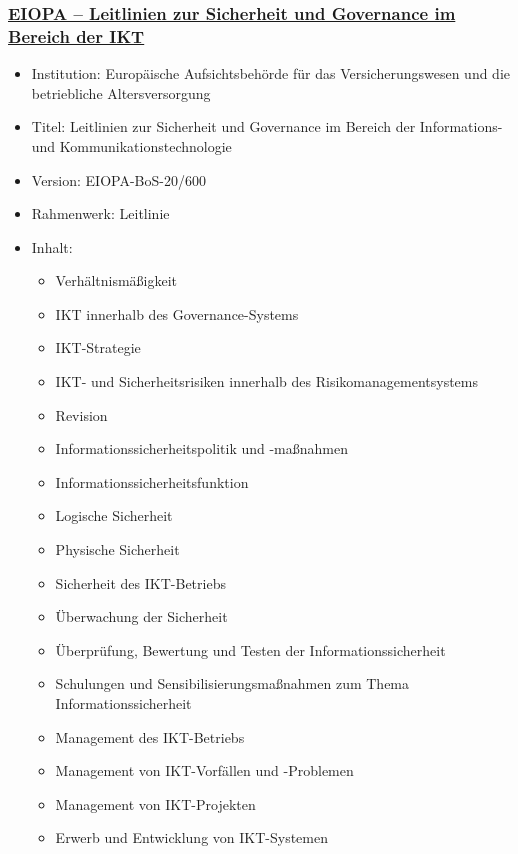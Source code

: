 
\subsubsection{\underline{EIOPA – Leitlinien zur Sicherheit und Governance im Bereich der IKT}}
\begin{itemize}
    \item Institution: Europäische Aufsichtsbehörde für das Versicherungswesen und die betriebliche Altersversorgung
    \item Titel: Leitlinien zur Sicherheit und Governance im Bereich der Informations- und Kommunikationstechnologie \autocite{Eiopa_guideline}
    \item Version: EIOPA-BoS-20/600
    \item Rahmenwerk: Leitlinie
    \item Inhalt:
        \begin{itemize}
            \item Verhältnismäßigkeit   
            \item IKT innerhalb des Governance-Systems   
            \item IKT-Strategie   
            \item IKT- und Sicherheitsrisiken innerhalb des Risikomanagementsystems   
            \item Revision   
            \item Informationssicherheitspolitik und -maßnahmen   
            \item Informationssicherheitsfunktion   
            \item Logische Sicherheit   
            \item Physische Sicherheit 
            \item Sicherheit des IKT-Betriebs   
            \item Überwachung der Sicherheit   
            \item Überprüfung, Bewertung und Testen der Informationssicherheit 
            \item Schulungen und Sensibilisierungsmaßnahmen zum Thema Informationssicherheit 
            \item Management des IKT-Betriebs 
            \item Management von IKT-Vorfällen und -Problemen 
            \item Management von IKT-Projekten   
            \item Erwerb und Entwicklung von IKT-Systemen   

\end{itemize}
\end{itemize}
